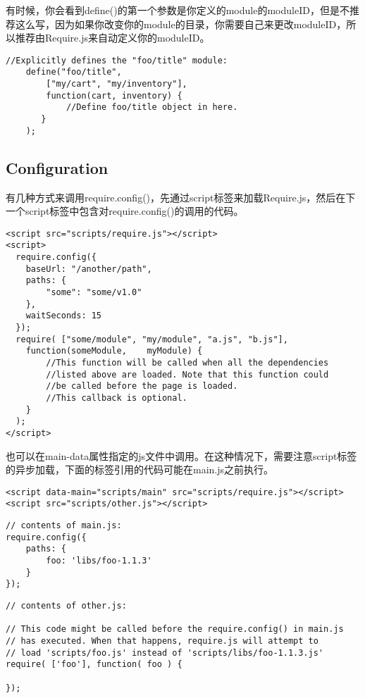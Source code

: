     有时候，你会看到define()的第一个参数是你定义的module的moduleID，但是不推荐这么写，因为如果你改变你的module的目录，你需要自己来更改moduleID，所以推荐由Require.js来自动定义你的moduleID。

    \begin{lstlisting}
//Explicitly defines the "foo/title" module:
    define("foo/title",
        ["my/cart", "my/inventory"],
        function(cart, inventory) {
            //Define foo/title object in here.
       }
    );
    \end{lstlisting}

    \subsection{Configuration}

    有几种方式来调用require.config()，先通过script标签来加载Require.js，然后在下一个script标签中包含对require.config()的调用的代码。
    \begin{lstlisting}
<script src="scripts/require.js"></script>
<script>
  require.config({
    baseUrl: "/another/path",
    paths: {
        "some": "some/v1.0"
    },
    waitSeconds: 15
  });
  require( ["some/module", "my/module", "a.js", "b.js"],
    function(someModule,    myModule) {
        //This function will be called when all the dependencies
        //listed above are loaded. Note that this function could
        //be called before the page is loaded.
        //This callback is optional.
    }
  );
</script>
    \end{lstlisting}
    也可以在main-data属性指定的js文件中调用。在这种情况下，需要注意script标签的异步加载，下面的标签引用的代码可能在main.js之前执行。
    \begin{lstlisting}
<script data-main="scripts/main" src="scripts/require.js"></script>
<script src="scripts/other.js"></script>
    \end{lstlisting}
    \begin{lstlisting}
// contents of main.js:
require.config({
    paths: {
        foo: 'libs/foo-1.1.3'
    }
});
    \end{lstlisting}
    \begin{lstlisting}
// contents of other.js:

// This code might be called before the require.config() in main.js
// has executed. When that happens, require.js will attempt to
// load 'scripts/foo.js' instead of 'scripts/libs/foo-1.1.3.js'
require( ['foo'], function( foo ) {

});
    \end{lstlisting}


